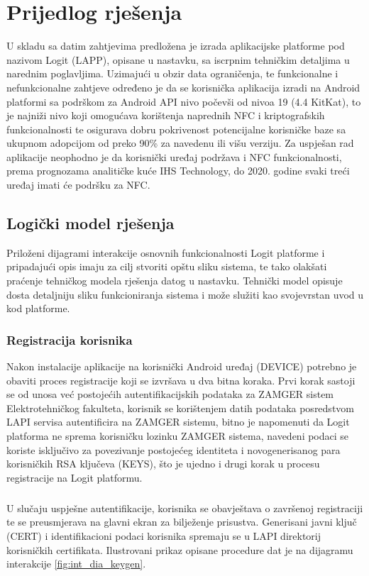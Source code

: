 \chapter{Prijedlog rješenja}
U skladu sa datim zahtjevima predložena je izrada aplikacijske platforme pod nazivom Logit (\gls{LAPP}), opisane u nastavku, sa iscrpnim tehničkim detaljima u narednim poglavljima. Uzimajući u obzir data ograničenja, te funkcionalne i nefunkcionalne zahtjeve određeno je da se korisnička aplikacija izradi na Android platformi sa podrškom za Android API nivo počevši od nivoa 19 (4.4 KitKat), to je najniži nivo koji omogućava korištenja naprednih NFC i kriptografskih funkcionalnosti te osigurava dobru pokrivenost potencijalne korisničke baze sa ukupnom adopcijom od preko 90\% za navedenu ili višu verziju\cite{droidstats}. Za uspješan rad aplikacije neophodno je da korisnički uređaj podržava i NFC funkcionalnosti, prema prognozama analitičke kuće IHS Technology, do 2020. godine svaki treći uređaj imati će podršku za NFC.\cite{nfcforecast}

\section{Logički model rješenja}
Priloženi dijagrami interakcije osnovnih funkcionalnosti Logit platforme i pripadajući opis imaju za cilj stvoriti opštu sliku sistema, te tako olakšati praćenje tehničkog modela rješenja datog u nastavku. Tehnički model opisuje dosta detaljniju sliku funkcioniranja sistema i može služiti kao svojevrstan uvod u kod platforme.

\subsection*{Registracija korisnika}
Nakon instalacije aplikacije na korisnički Android uređaj (DEVICE) potrebno je obaviti proces registracije koji se izvršava u dva bitna koraka. Prvi korak sastoji se od unosa već postojećih autentifikacijskih podataka za ZAMGER sistem Elektrotehničkog fakulteta, korisnik se korištenjem datih podataka posredstvom LAPI servisa autentificira na ZAMGER sistemu, bitno je napomenuti da Logit platforma ne sprema korisničku lozinku ZAMGER sistema, navedeni podaci se koriste isključivo za povezivanje postojećeg identiteta i novogenerisanog para korisničkih RSA ključeva (KEYS), što je ujedno i drugi korak u procesu registracije na Logit platformu.

\paragraph*{}
U slučaju uspješne autentifikacije, korisnika se obavještava o završenoj registraciji te se preusmjerava na glavni ekran za bilježenje prisustva. Generisani javni ključ (CERT) i identifikacioni podaci korisnika spremaju se u LAPI direktorij korisničkih certifikata. Ilustrovani prikaz opisane procedure dat je na dijagramu interakcije \ref{fig:int_dia_keygen}.


